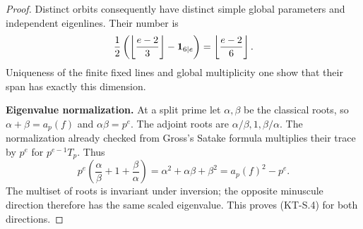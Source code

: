 \documentclass[11pt,a4paper]{article}
\theoremstyle{definition}
\renewcommand{\paragraph}[1]{\par\smallskip\noindent\textbf{#1}\quad\ignorespaces}
\begin{document}
\begin{proof}
Distinct orbits consequently have distinct simple global
parameters and independent eigenlines.  Their number is
\[
 \frac12\left(
        \left\lfloor\frac{e-2}{3}\right\rfloor
          -{\bf1}_{6\mid e}\right)
        =\left\lfloor\frac{e-2}{6}\right\rfloor.
\]
Uniqueness of the finite fixed lines and global multiplicity
one show that their span has exactly this dimension.

\paragraph{Eigenvalue normalization.}
At a split prime let $\alpha,\beta$ be the classical roots,
so $\alpha+\beta=a_p(f)$ and $\alpha\beta=p^e$.
The adjoint roots are $\alpha/\beta,1,\beta/\alpha$.
The normalization already checked from Gross's Satake formula
multiplies their trace by $p^e$ for $p^{e-1}T_p$.  Thus
\[
 p^e\left(\frac\alpha\beta+1+\frac\beta\alpha\right)
       =\alpha^2+\alpha\beta+\beta^2
       =a_p(f)^2-p^e.
\]
The multiset of roots is invariant under inversion; the
opposite minuscule direction therefore has the same scaled
eigenvalue.  This proves (KT-S.4) for both directions.
\end{proof}
\end{document}
